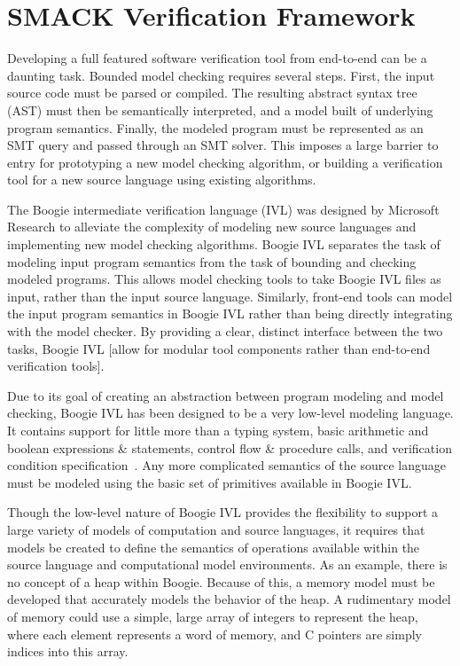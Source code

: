 \chapter{SMACK Verification Framework}\label{ch:smackframework}
Developing a full featured software verification tool from end-to-end
can be a daunting task.  Bounded model checking requires several
steps.  First, the input source code must be parsed or compiled.  The
resulting abstract syntax tree (AST) must then be semantically
interpreted, and a model built of underlying program semantics.
Finally, the modeled program must be represented as an SMT query and
passed through an SMT solver.  This imposes a large barrier to entry
for prototyping a new model checking algorithm, or building a
verification tool for a new source language using existing
algorithms. 

The Boogie intermediate verification language (IVL) was designed by
Microsoft Research to alleviate the complexity of modeling new source
languages and implementing new model checking algorithms.  Boogie IVL
separates the task of modeling input program semantics from the task
of bounding and checking modeled programs.  This allows model checking
tools to take Boogie IVL files as input, rather than the input source
language.  Similarly, front-end tools can model the input program
semantics in Boogie IVL rather than being directly integrating with
the model checker.  By providing a clear, distinct interface between
the two tasks, Boogie IVL [allow for modular tool components rather
than end-to-end verification tools]. 

Due to its goal of creating an abstraction between program modeling
and model checking, Boogie IVL has been designed to be a very
low-level modeling language.  It contains support for little more than
a typing system, basic arithmetic and boolean expressions \&
statements, control flow \& procedure calls, and verification
condition specification~\cite{boogie}.  Any more complicated semantics
of the source language must be modeled using the basic set of
primitives available in Boogie IVL. 

Though the low-level nature of Boogie IVL provides the flexibility to
support a large variety of models of computation and source languages,
it requires that models be created to define the semantics of
operations available within the source language and computational
model environments.  As an example, there is no concept of a heap
within Boogie.  Because of this, a memory model must be developed that
accurately models the behavior of the heap.  A rudimentary model of
memory could use a simple, large array of integers to represent the
heap, where each element represents a word of memory, and C pointers
are simply indices into this array. 

